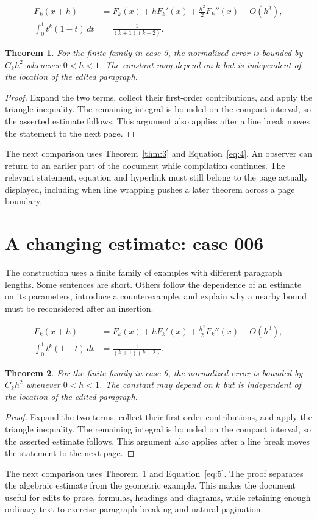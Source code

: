 \documentclass[a4paper,10pt]{article}
\newtheorem{theorem}{Theorem}[section]
\begin{document}
\lipsum[13-14]
\begin{align}\label{eq:4}
 F_k(x+h)&=F_k(x)+hF_k'(x)+\frac{h^2}{2}F_k''(x)+O(h^3),\\
 \int_0^1 t^k(1-t)\,dt&=\frac{1}{(k+1)(k+2)}.
\end{align}
\begin{theorem}\label{thm:4}
For the finite family in case 5, the normalized error is bounded by $C_k h^2$ whenever $0<h<1$. The constant may depend on $k$ but is independent of the location of the edited paragraph.
\end{theorem}
\begin{proof}
Expand the two terms, collect their first-order contributions, and apply the
triangle inequality. The remaining integral is bounded on the compact interval,
so the asserted estimate follows. This argument also applies after a line break
moves the statement to the next page.
\end{proof}
The next comparison uses Theorem~\ref{thm:3} and Equation~\ref{eq:4}. An observer can return to an earlier part of the document while compilation continues. The relevant statement, equation and hyperlink must still belong to the page actually displayed, including when line wrapping pushes a later theorem across a page boundary.

\lipsum[23]

\section{A changing estimate: case 006}\label{unit:5}
The construction uses a finite family of examples with different paragraph lengths. Some sentences are short. Others follow the dependence of an estimate on its parameters, introduce a counterexample, and explain why a nearby bound must be reconsidered after an insertion.

\lipsum[16-17]
\begin{align}\label{eq:5}
 F_k(x+h)&=F_k(x)+hF_k'(x)+\frac{h^2}{2}F_k''(x)+O(h^3),\\
 \int_0^1 t^k(1-t)\,dt&=\frac{1}{(k+1)(k+2)}.
\end{align}
\begin{theorem}\label{thm:5}
For the finite family in case 6, the normalized error is bounded by $C_k h^2$ whenever $0<h<1$. The constant may depend on $k$ but is independent of the location of the edited paragraph.
\end{theorem}
\begin{proof}
Expand the two terms, collect their first-order contributions, and apply the
triangle inequality. The remaining integral is bounded on the compact interval,
so the asserted estimate follows. This argument also applies after a line break
moves the statement to the next page.
\end{proof}
The next comparison uses Theorem~\ref{thm:4} and Equation~\ref{eq:5}. The proof separates the algebraic estimate from the geometric example. This makes the document useful for edits to prose, formulas, headings and diagrams, while retaining enough ordinary text to exercise paragraph breaking and natural pagination.
\end{document}
